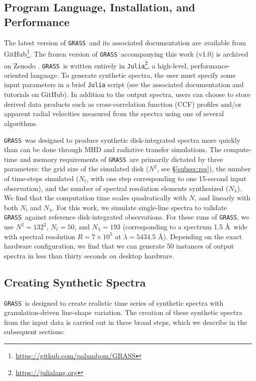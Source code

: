 \documentclass[twocolumn]{aastex63}
\newcommand{\grass}{\texttt{GRASS}}
\newcommand{\revise}[1]{#1}
\begin{document}
\subsection{Program Language, Installation, and Performance}
The latest version of \grass\ and its associated documentation are available from GitHub\footnote{\url{https://github.com/palumbom/GRASS}}. \revise{The frozen version of \grass\ accompanying this work (v1.0) is archived on Zenodo \citep{GRASS}.} \grass\ is written entirely in \texttt{Julia}\footnote{\url{https://julialang.org}}, a high-level, performance-oriented language. To generate synthetic spectra, the user must specify some input parameters in a brief \texttt{Julia} script (see the associated documentation and tutorials on GitHub). In addition to the output spectra, users can choose to store derived data products such as cross-correlation function (CCF) profiles and/or apparent radial velocities measured from the spectra using one of several algorithms. \par 

\grass\ was designed to produce synthetic disk-integrated spectra more quickly than can be done through MHD and radiative transfer simulations. The compute-time and memory requirements of \grass\ are primarily dictated by three parameters: the grid size of the simulated disk ($N^2$, see \S\ref{subsec:res}), the number of time-steps simulated ($N_t$, with one step corresponding to one 15-second input observation), and the number of spectral resolution elements synthesized ($N_\lambda$). We find that the computation time scales quadratically with $N$, and linearly with both $N_t$ and $N_\lambda$. For this work, we simulate single-line spectra to validate \grass\ against reference disk-integrated observations. For these runs of \grass, we use \revise{$N^2 = 132^2$}, $N_t = 50$, and $N_\lambda = 193$ (corresponding to a spectrum 1.5 \AA\ wide with spectral resolution $R = 7\times10^5$ at $\lambda = 5434.5$ \AA). Depending on the exact hardware configuration, we find that we can generate 50 instances of output spectra in less than \revise{thirty seconds} on desktop hardware. \par

\subsection{Creating Synthetic Spectra} \label{subsec:create}
\grass\ is designed to create realistic time series of synthetic spectra with granulation-driven line-shape variation. The creation of these synthetic spectra from the input data is carried out in three broad steps, which we describe in the subsequent sections:
\end{document}
